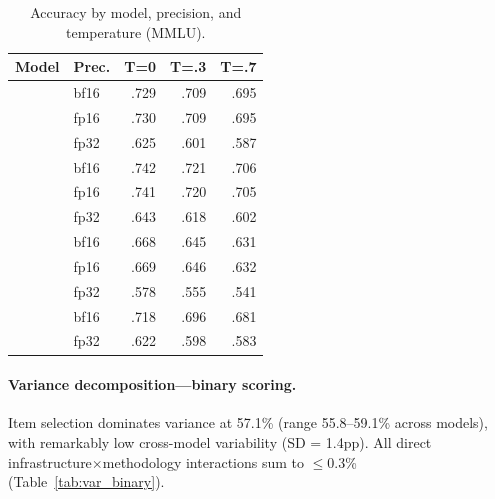 \documentclass[11pt,twocolumn]{article}
\begin{document}
\begin{table}[t]
\centering
\caption{Accuracy by model, precision, and temperature (MMLU).}
\label{tab:accuracy}
\small
\begin{tabular}{llRRR}
\toprule
Model & Prec. & \footnotesize{T=0} & \footnotesize{T=.3} & \footnotesize{T=.7} \\
\midrule
{} & bf16 & .729 & .709 & .695 \\
 & fp16 & .730 & .709 & .695 \\
 & fp32 & .625 & .601 & .587 \\
\midrule
{} & bf16 & .742 & .721 & .706 \\
 & fp16 & .741 & .720 & .705 \\
 & fp32 & .643 & .618 & .602 \\
\midrule
{} & bf16 & .668 & .645 & .631 \\
 & fp16 & .669 & .646 & .632 \\
 & fp32 & .578 & .555 & .541 \\
\midrule
{} & bf16 & .718 & .696 & .681 \\
 & fp32 & .622 & .598 & .583 \\
\bottomrule
\end{tabular}
\end{table}

\paragraph{Variance decomposition---binary scoring.}
Item selection dominates variance at 57.1\% (range 55.8--59.1\% across models), with remarkably low cross-model variability (SD = 1.4pp).
All direct infrastructure$\times$methodology interactions sum to $\leq$0.3\% (Table~\ref{tab:var_binary}).
\end{document}
